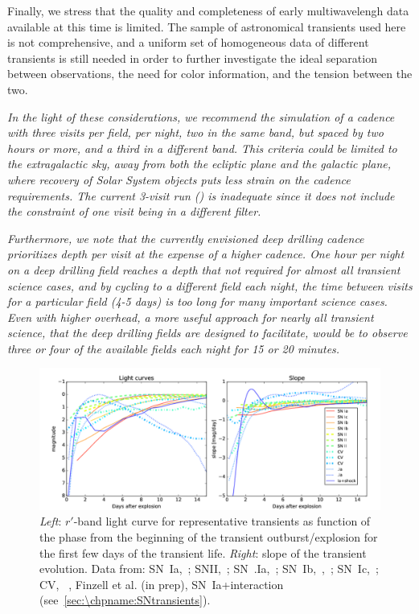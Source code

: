 Finally, we stress that the quality and completeness of early
multiwavelengh data available at this time is limited. The sample of
astronomical transients used here is not comprehensive, and a uniform
set of homogeneous data of different transients is still needed in
order to further investigate the ideal separation between
observations, the need for color information, and the tension between
the two.

{\emph{In the light of these considerations, we recommend the
    simulation of a cadence with three visits per field, per night,
    two in the same band, but spaced by two hours or more, and a third
    in a different band. This criteria could be limited to the
    extragalactic sky, away from both the ecliptic plane and the
    galactic plane, where recovery of Solar System objects puts less
    strain on the cadence requirements.  The current 3-visit \OpSim run
    () is inadequate since it
    does not include the constraint of one visit being in a different
    filter.}}

{\emph{Furthermore, we note that the currently envisioned deep
    drilling cadence prioritizes depth per visit at the expense of a
    higher cadence. One hour per night on a deep drilling field
    reaches a depth that not required for almost all transient science
    cases, and by cycling to a different field each night, the time
    between visits for a particular field (4-5 days) is too long for
    many important science cases. Even with higher overhead, a more
    useful approach for nearly all transient science, that the deep
    drilling fields are designed to facilitate, would be to observe
    three or four of the available fields each night for 15 or 20
    minutes.}}

\begin{figure}[hbt]
\centerline{
\includegraphics[width=\textwidth]{figs/transients/earlyslope1.pdf}
}
\caption{\emph{Left}: $r'$-band light curve for representative transients as function of the phase from the beginning of the transient outburst/explosion for the first few days of the transient life. \emph{Right}: slope of the transient evolution. Data from: SN~Ia,~\citet{Olling15}; SNII,~\citet{Rubin16}; SN~.Ia,~\citet{Shen10}; SN~Ib,~\citet{Valenti11},~\citet{Cao13}; SN~Ic,~\citet{Mazzali02}; CV, ~\citet{Sokoloski13}, Finzell et al. (in prep), SN~Ia+interaction (see~\autoref{sec:\chpname:SNtransients}).}
\label{fig:earlyslope}
\end{figure}

